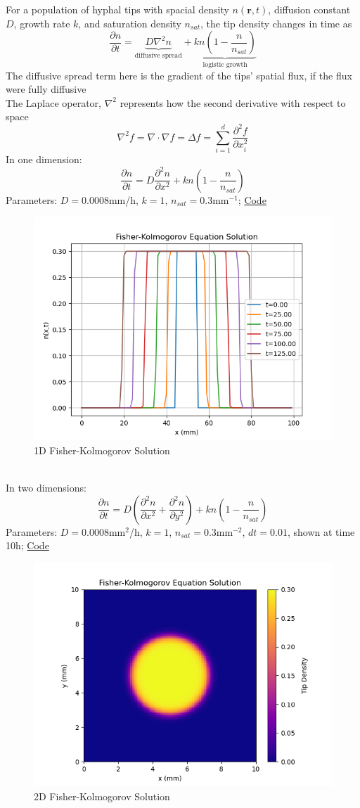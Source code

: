 \documentclass{article}
\begin{document}
For a population of hyphal tips with spacial density $n(\mathbf{r},t)$, diffusion constant $D$, growth rate $k$, and saturation density $n_{sat}$, the tip density changes in time as
\[ \frac{\partial n}{\partial t} = \underbrace{D \nabla^2 n}_{\text{diffusive spread}} + \underbrace{kn\left(1 - \frac{n}{n_{sat}}\right)}_{\text{logistic growth}} \]
The diffusive spread term here is the gradient of the tips' spatial flux, if the flux were fully diffusive\\
The Laplace operator, $\nabla^2$ represents how the second derivative with respect to space \cite{wikipediaLaplaceOperator}
\[\nabla^2 f= \nabla\cdot\nabla f = \Delta f = \sum_{i=1}^{d}\frac{\partial^2 f}{\partial x_i^2}\] 
In one dimension:
\[ \frac{\partial n}{\partial t} = D \frac{\partial^2 n}{\partial x^2} + kn\left(1 - \frac{n}{n_{sat}}\right) \]
Parameters: $D = 0.0008 $mm/h, $k = 1$, $n_{sat} = 0.3$mm$^{-1}$; \hyperlink{FK_1D_Code}{Code}\\
\begin{figure}[h]
    \centering
    \includegraphics[width=0.5\linewidth]{FK_1D.png}
    \caption{1D Fisher-Kolmogorov Solution}
    \label{fig:enter-label}
\end{figure}\\


In two dimensions:
\[ \frac{\partial n}{\partial t} = D \left(\frac{\partial^2 n}{\partial x^2}+\frac{\partial^2 n}{\partial y^2}\right) + kn\left(1 - \frac{n}{n_{sat}}\right) \]
Parameters: $D = 0.0008 $mm$^2$/h, $k = 1$, $n_{sat} = 0.3$mm$^{-2}$, $dt = 0.01$, shown at time 10h; \hyperlink{FK_2D_Code}{Code}
\begin{figure}[h]
    \centering
    \includegraphics[width=0.5\linewidth]{FK_2D.png}
    \caption{2D Fisher-Kolmogorov Solution}
    \label{fig:enter-label}
\end{figure}
\end{document}
